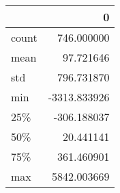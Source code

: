 \begin{tabular}{lr}
\toprule
{} &            0 \\
\midrule
count &   746.000000 \\
mean  &    97.721646 \\
std   &   796.731870 \\
min   & -3313.833926 \\
25\%   &  -306.188037 \\
50\%   &    20.441141 \\
75\%   &   361.460901 \\
max   &  5842.003669 \\
\bottomrule
\end{tabular}
